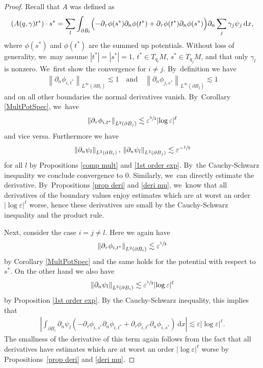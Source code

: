 \documentclass[10pt]{amsart}
\let\epsilon\varepsilon
\theoremstyle{definition}
\newcommand\norm[1]{\left\lVert #1\right\rVert}
\newcommand\eq{=}
\newcommand\dd{\,\mathrm{d}}
\newcommand\dx{\dd x}
\let\de\partial
\let\eps\epsilon
\begin{document}
\begin{proof} Recall that $A$ was defined as
\begin{align*}
(A(q,\gamma)t^*)\cdot s^*\eq\sum_l\int_{\de B_l}\Bigl(-\de_\tau\phi(s^*)\de_n\phi(t^*)+\de_\tau\phi(t^*)\de_n\phi(s^*)\Bigr)\de_n\sum_j\gamma_j\psi_j\dx,
\end{align*}
where $\phi(s^*)$ and $\phi(t^*)$ are the summed up potentials.
Without loss of generality, we~may assume $|t^*|=|s^*|=1$, $t^*\in T_{q_i}M$, $s^*\in T_{q_j}M$, and that only $\gamma_l$ is nonzero. We~first show the convergence for $i\neq j$. By~definition we have
\begin{align*}
\norm{\de_n\phi_{i,t^*}}_{L^\infty(\de B_i)}\lesssim 1\quad\text{and}\quad \norm{\de_n\phi_{j,s^*}}_{L^\infty(\de B_j)}\lesssim 1
\end{align*}
and on all other boundaries the normal derivatives vanish. By~Corollary \ref{MultPotSpec}, we~have
\begin{align*}
\norm{\de_\tau\phi_{i,t^*}}_{L^2(\de B_j)}\lesssim \eps^{\sfrac{5}{2}}|{\log\eps}|^\ell
\end{align*}
and vice versa. Furthermore we have
\begin{align*}
\norm{\de_n\psi_l}_{L^2(\de B_i)},\,\norm{\de_n\psi_l}_{L^2(\de B_j)}\lesssim \eps^{-\sfrac{1}{2}}
\end{align*}
for all $l$ by Propositions \ref{comp mult} and \ref{1st order exp}. By~the Cauchy-Schwarz inequality we conclude convergence to $0$. Similarly, we~can directly estimate the derivative. By~Propositions \ref{prop deri} and \ref{deri mu}, we~know that all derivatives of the boundary values enjoy estimates which are at worst an order $|{\log\eps}|^\ell$ worse, hence these derivatives are small by the Cauchy-Schwarz inequality and the product rule.

Next, consider the case $i=j\neq l$. Here we again have
\begin{align*}
\norm{\de_\tau\phi_{i,t^*}}_{L^2(\de B_i)}\lesssim \eps^{\sfrac{1}{2}}
\end{align*}
by Corollary \ref{MultPotSpec} and the same holds for the potential with respect to $s^*$. On the other hand we also have
\begin{align*}
\norm{\de_n\psi_l}_{L^2(\de B_i)}\lesssim \eps^{\sfrac{1}{2}}|{\log\eps}|^\ell
\end{align*}
by Proposition \ref{1st order exp}.
By the Cauchy-Schwarz inequality, this implies that
\begin{align*}
\left|\int_{\de B_i}\de_n\psi_l\left(-\de_\tau\phi_{i,s^*}\de_n\phi_{i,t^*}+\de_\tau\phi_{i,t^*}\de_n\phi_{i,s^*}\right)\dx\right|\lesssim \eps|{\log\eps}|^\ell.
\end{align*}
The smallness of the derivative of this term again follows from the fact that all derivatives have estimates which are at worst an order $|{\log\eps}|^\ell$ worse by Propositions~\ref{prop deri} and \ref{deri mu}.


\end{proof}
\end{document}
